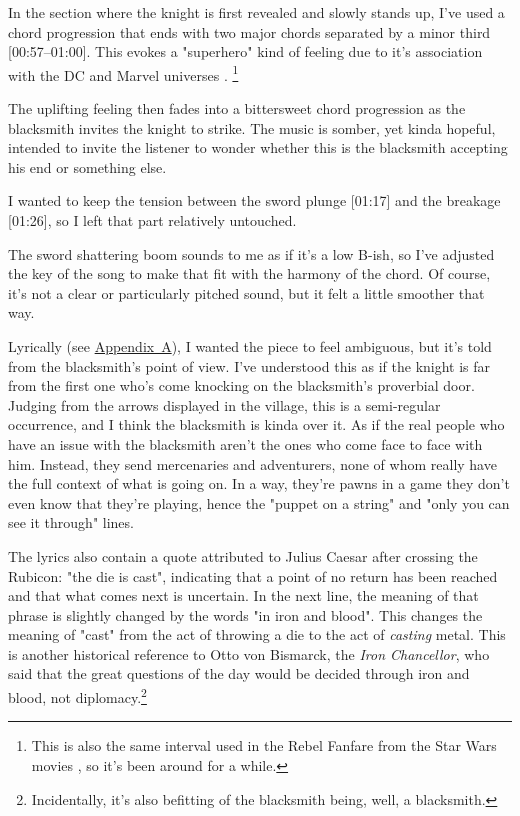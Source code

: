 


In the section where the knight is first revealed and slowly stands up, I've used a chord progression that ends with two major chords separated by a minor third [00:57--01:00]. This evokes a "superhero" kind of feeling due to it's association with the DC and Marvel universes \autocite[04:22-04:48]{8-bitmusictheorySpiderManEffectiveUse2018}. \footnote{This is also the same interval used in the Rebel Fanfare from the Star Wars movies \autocite[01:42--01:45]{flashmusicStarWarsRebel2018}, so it's been around for a while.}


The uplifting feeling then fades into a bittersweet chord progression as the blacksmith invites the knight to strike. The music is somber, yet kinda hopeful, intended to invite the listener to wonder whether this is the blacksmith accepting his end or something else.

I wanted to keep the tension between the sword plunge [01:17] and the breakage [01:26], so I left that part relatively untouched.

The sword shattering boom sounds to me as if it's a low B-ish, so I've adjusted the key of the song to make that fit with the harmony of the chord. Of course, it's not a clear or particularly pitched sound, but it felt a little smoother that way.

Lyrically (see \hyperref[appendixA]{Appendix~A}), I wanted the piece to feel ambiguous, but it's told from the blacksmith's point of view. I've understood this as if the knight is far from the first one who's come knocking on the blacksmith's proverbial door. Judging from the arrows displayed in the village, this is a semi-regular occurrence, and I think the blacksmith is kinda over it. As if the real people who have an issue with the blacksmith aren't the ones who come face to face with him. Instead, they send mercenaries and adventurers, none of whom really have the full context of what is going on. In a way, they're pawns in a game they don't even know that they're playing, hence the "puppet on a string" and "only you can see it through" lines.

The lyrics also contain a quote attributed to Julius Caesar after crossing the Rubicon: "the die is cast"\autocite{AleaIactaEst2026}, indicating that a point of no return has been reached and that what comes next is uncertain. In the next line, the meaning of that phrase is slightly changed by the words "in iron and blood". This changes the meaning of "cast" from the act of throwing a die to the act of \textit{casting} metal. This is another historical reference to Otto von Bismarck, the \textit{Iron Chancellor}\autocite{OttoBismarck2026}, who said that the great questions of the day would be decided through iron and blood, not diplomacy.\footnote{Incidentally, it's also befitting of the blacksmith being, well, a blacksmith.}
